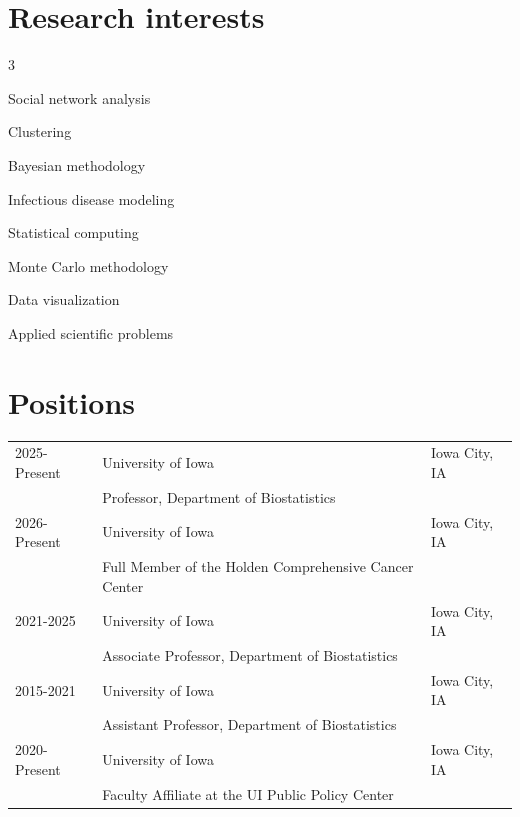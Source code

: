 \documentclass[11pt]{article}
\begin{document}
\vspace{1pc}
\section{Research interests}
\vspace{-1pc}
\begin{multicols}{3}
\begin{description}
\item Social network analysis
\item Clustering
\item Bayesian methodology
\item Infectious disease modeling
\item Statistical computing
\item Monte Carlo methodology
\item Data visualization
\item Applied scientific problems
\end{description}
\end{multicols}


\vspace{0.5pc}
\section{Positions}
\begin{tabular}{lll}
	2025-Present & University of Iowa & Iowa City, IA \\
				 & Professor, Department of Biostatistics & \\
	2026-Present & University of Iowa & Iowa City, IA \\
	& Full Member of the Holden Comprehensive Cancer Center& \\
	2021-2025 & University of Iowa & Iowa City, IA \\
				 & Associate Professor, Department of Biostatistics & \\
	2015-2021 & University of Iowa & Iowa City, IA \\
				 & Assistant Professor, Department of Biostatistics & \\
	2020-Present & University of Iowa & Iowa City, IA \\
				 & Faculty Affiliate at the UI Public Policy Center &\\
\end{tabular}
\end{document}
